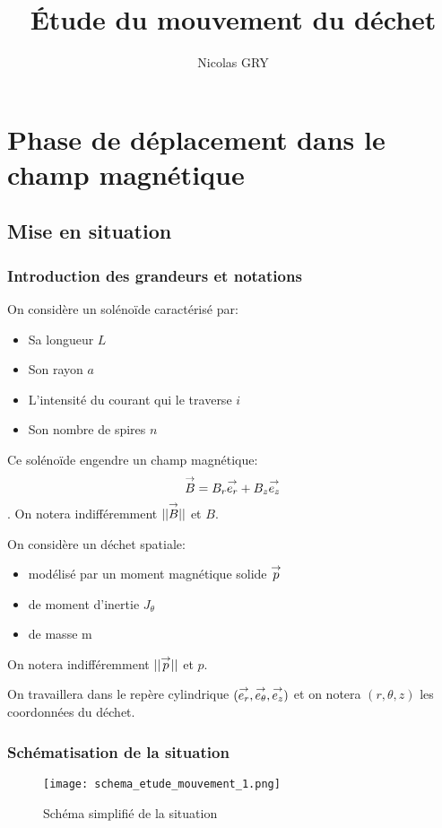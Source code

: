 \documentclass{report}
\author{Nicolas GRY}
\title{Étude du mouvement du déchet}
\begin{document}
\maketitle
\tableofcontents
\newpage
\chapter{Phase de déplacement dans le champ magnétique}
\section{Mise en situation}
\subsection{Introduction des grandeurs et notations}

On considère un solénoïde caractérisé par:
\begin{itemize}
    \item Sa longueur $L$
    \item Son rayon $a$
    \item L'intensité du courant qui le traverse $i$
    \item Son nombre de spires $n$ 
\end{itemize}
Ce solénoïde engendre un champ magnétique:
 $$\overset{\to}{B} = B_r \overset{\to}{e_r} + B_z \overset{\to}{e_z}$$.
On notera indifféremment $||\overset{\to}{B}||$ et $B$.

On considère un déchet spatiale:
\begin{itemize}
    \item modélisé par un moment magnétique solide $\overset{\to}{p}$
    \item de moment d'inertie $J_\theta$
    \item de masse m
\end{itemize} 
On notera indifféremment $||\overset{\to}{p}||$ et $p$.

On travaillera dans le repère cylindrique $(\overset{\to}{e_r},\overset{\to}{e_\theta},\overset{\to}{e_z})$ et on notera $(r,\theta,z)$ les coordonnées du déchet.

\subsection{Schématisation de la situation}

\begin{figure}[h]
    \centering
    \texttt{[image: schema\_etude\_mouvement\_1.png]}
    \caption{Schéma simplifié de la situation}
\end{figure}  
\end{document}
